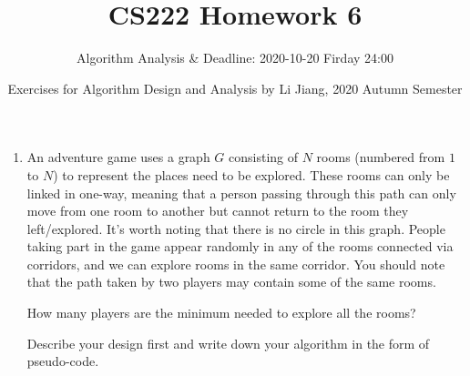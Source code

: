 \documentclass{article}
\title{CS222 Homework 6}
\author{Algorithm Analysis \& Deadline: 2020-10-20 Firday 24:00}
\date{Exercises for Algorithm Design and Analysis by Li Jiang, 2020 Autumn Semester}
\begin{document}
\maketitle

\begin{enumerate}

\item An adventure game uses a graph $G$ consisting of $N$ rooms (numbered from $1$ to $N$) to represent the places need to be explored. These rooms can only be linked in one-way, meaning that a person passing through this path can only move from one room to another but cannot return to the room they left/explored. It’s worth noting that there is no circle in this graph. People taking part in the game appear randomly in any of the rooms connected via corridors, and we can explore rooms in the same corridor. You should note that the path taken by two players may contain some of the same rooms.

How many players are the minimum needed to explore all the rooms?

Describe your design first and write down your algorithm in the form of pseudo-code.


\end{enumerate}
\end{document}
